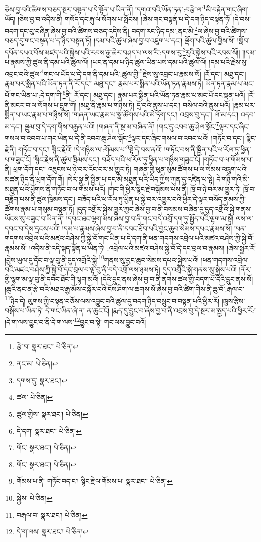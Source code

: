 ཅེས་བྱ་བའི་ཚིགས་བཅད་སྔར་བསྟན་པ་དེ་སྟོན་པ་ཡིན་ནོ། །དགའ་བའི་ཡོན་ཏན་:བརྩེ་ལ་\footnote{རྩེ་བ་  སྣར་ཐང་།  པེ་ཅིན། }མི་བརྟེན་གང་ཞིག་ཡོད། །ཅེས་བྱ་བ་འདིས་ནི། གསོད་དང་རྐུ་ལ་སོགས་པ་སྤོངས། །ཞེས་གང་བསྟན་པ་དེ་དག་ཉིད་བསྟན་ཏོ། །དེ་བས་བདག་དང་བུ་བཞིན་ཞེས་བྱ་བའི་ཚིགས་བཅད་འདིས་ནི། བདག་རང་ཉིད་དམ་:ནང་མི་\footnote{ནང་མ་  པེ་ཅིན། }ལ་ཞེས་བྱ་བའི་ཚིགས་བཅད་དུ་གང་བསྟན་པ་ད་ཉིད་བསྟན་ཏོ། །དམ་པའི་ཚུལ་ཞེས་བྱ་བ་འཇུག་པ་དང་། ལྡོག་པའི་ཚུལ་གྱིས་སོ། །སློབ་དཔོན་དཔའ་བོས་མཛད་པའི་སྐྱེས་པའི་རབས་རྒྱ་ཆེར་བཤད་པ་ལས་རི་:དགས་རུ་\footnote{དགས་དུ་  སྣར་ཐང་། }རུའི་སྐྱེས་པའི་རབས་སོ།། །།དམ་པ་རྣམས་ཀྱི་ཚུལ་ནི་དམ་པའི་ཚུལ་ལོ། །ཡང་ན་དམ་པ་ཉིད་ཚུལ་ཡིན་པས་དམ་པའི་ཚུལ་ལོ། །དམ་པའི་རྗེས་སུ་འབྲང་བའི་ཚུལ་\footnote{ཚལ་  པེ་ཅིན། }གང་ལ་ཡོད་པ་དེ་དག་ནི་དམ་པའི་:ཚུལ་གྱི་\footnote{ཚུལ་གྱིས་  སྣར་ཐང་།  པེ་ཅིན། }རྗེས་སུ་འབྲང་པ་རྣམས་སོ། །རོ་དང་། མཐུ་དང་། རྣམ་པར་སྨིན་པའི་ཡོན་ཏན་ནི་རོ་དང་། མཐུ་དང་། རྣམ་པར་སྨིན་པའི་ཡོན་ཏན་རྣམས་ཏེ། ཡོན་ཏན་རྣམ་པ་མང་པོ་གང་ཡིན་པ་:དེ་དག་གི་\footnote{དེ་དག་  སྣར་ཐང་།  པེ་ཅིན། }ནི། རོ་དང་། མཐུ་དང་། རྣམ་པར་སྨིན་པའི་ཡོན་ཏན་རྣམ་པ་མང་པོ་དང་ལྡན་པའོ། །རོ་ནི་མངར་བ་ལ་སོགས་པ་དྲུག་གོ། །མཐུ་ནི་རྣམ་པ་གཉིས་ཏེ། དྲོ་བའི་ནུས་པ་དང་། བསིལ་བའི་ནུས་པའོ། །རྣམ་པར་སྨིན་པ་ཡང་རྣམ་པ་གཉིས་སོ། །གཞན་ཡང་རྣམ་པ་སྣ་ཚོགས་པའི་མེ་ཏོག་དང་། འབྲས་བུ་དང་། ལོ་མ་དང་། འདབ་མ་དང་། ལྡུམ་བུ་དེ་དག་གིས་བརྒྱན་པའོ། །གཞན་ནི་སྔ་མ་བཞིན་ནོ། །གང་དུ་འབབ་ཆུ་ཤེལ་སྒོང་\footnote{གོང་  སྣར་ཐང་།  པེ་ཅིན། }ལྟར་དང་ཞིང་གསལ་བ་འབབ་པ་གང་ཡིན་པ་དེ་ནི་འབབ་ཆུ་ཤེལ་སྒོང་\footnote{གོང་  སྣར་ཐང་།  པེ་ཅིན། }ལྟར་དང་ཞིང་གསལ་བ་འབབ་པའོ། །གཏོང་བ་དང་། སྙིང་རྗེ་ནི། གཏོང་བ་དང་། སྙིང་རྗེའོ། །དེ་གཉིས་ལ་:གོམས་པ་\footnote{གོམས་པ་ནི། གཏོང་བད་ང་། སྙིང་རྗེ་ལ་གོམས་པ་  སྣར་ཐང་།  པེ་ཅིན། }སྟེ་དེ་བས་ནའོ། །གཏོང་བས་ནི་སྦྱིན་པའི་ཕ་རོལ་ཏུ་ཕྱིན་པ་གཟུང་ངོ། །སྙིང་རྗེས་ནི་ཚུལ་ཁྲིམས་དང་། བཟོད་པའི་ཕ་རོལ་ཏུ་ཕྱིན་པ་གཉིས་གཟུང་ངོ། །གཏོང་བ་ལ་གོམས་པ་ནི། ཕྲག་དོག་དང་། འཇུངས་པ་ཉེ་བར་འོང་བར་མ་གྱུར་ཏེ། གཞན་གྱི་ཕུན་སུམ་ཚོགས་པ་ལ་སེམས་འཁྲུག་པའི་མཚན་ཉིད་ནི་ཕྲག་དོག་གོ། །སེར་སྣ་ནི་སྦྱིན་པ་དང་མི་མཐུན་པའི་ཡིད་ཀྱིས་ཀུན་དུ་འཛིན་པ་སྟེ། དེ་གཉི་གའི་མི་མཐུན་པའི་ཕྱོགས་ནི་གཏོང་བ་ལ་གོམས་པའོ། །གང་གི་ཕྱིར་སྙིང་རྗེ་བསྒོམས་པས་ནི། ཁྲོ་བ་ཉེ་བར་མ་གྱུར་ཏེ། ཁྲོ་བ་བཟློག་པས་ནི་ཚུལ་ཁྲིམས་དང་། བཟོད་པའི་ཕ་རོལ་ཏུ་ཕྱིན་པ་སྐྱེ་བར་འགྱུར་བའི་ཕྱིར་དེ་ལྟར་བསོད་ནམས་ཀྱི་ཚོགས་རྣམ་པ་གསུམ་བསྟན་ཏོ། །དུད་འགྲོར་སྐྱེས་གྱུར་ཀྱང་ཞེས་བྱ་བ་ནི་བསམས་བཞིན་དུ་དུད་འགྲོའི་སྐྱེ་གནས་ཡོངས་སུ་བཟུང་བ་ཡིན་ནོ། །དབང་ཐང་ལྷག་མས་ཞེས་བྱ་བ་ནི་གང་བདེ་འགྲོ་དག་ཏུ་སྤྱོད་པའི་ལྷག་མ་སྟེ། ལས་ལ་དབང་བ་དེས་དྲངས་པའོ། །དམ་པ་རྣམས་ཞེས་བྱ་བ་ནི་དབང་ཐོབ་པའི་བྱང་ཆུབ་སེམས་དཔའ་རྣམས་སོ། །ཕན་གདགས་འབྲེལ་པའི་མཛའ་བཤེས་ཀྱི་སྐྱེ་བོ་གང་ཡིན་པ་དེ་དག་ནི་ཕན་གདགས་འབྲེལ་པའི་མཛའ་བཤེས་ཀྱི་སྐྱེ་བོ་རྣམས་སོ། །འདིས་ནི་འདི་སྐད་སྟོན་པ་ཡིན་ཏེ། :འབྲེལ་པའི་མཛའ་བཤེས་སྐྱེ་བོ་དེ་དང་བྲལ་བ་རྣམས། །ཞེས་སྦྱར་རོ། །བྱེས་ཡུལ་དུ་དོང་བ་ལྟ་བུ་ནི་དུད་འགྲོའི་སྐྱེ་\footnote{སྐྱེས་  པེ་ཅིན། }གནས་སུ་བྱང་ཆུབ་སེམས་དཔའ་སྐྱེས་པའོ། །ཕན་གདགས་འབྲེལ་བའི་མཛའ་བཤེས་ཀྱི་སྐྱེ་བོ་དང་བྲལ་བ་ལྟ་བུ་ནི་བདེ་འགྲོ་ལས་ཉམས་ཏེ། དུད་འགྲོའི་སྐྱེ་གནས་སུ་སྐྱེས་པའོ། །ནོར་གྱི་ལྷག་མ་ལྟ་བུ་ནི་དབང་ཐོང་གི་ལྷག་མའོ། །དེའི་དྲུང་ནས་ཞེས་བྱ་བ་ནི་ནགས་ཚལ་གྱི་བདག་པོ་དེའི་དྲུང་ནས་སོ། །ཆུའི་ནང་ན་རྩེ་བའི་མཐའ་རྒྱ་མོས་བསྐོར་བའི་ངོས་ཤིག་ལ་ཆགས་སོ་ཞེས་བྱ་བའི་ཚིག་གིས་ནི་ཆུ་བོ་:རྒལ་བ་\footnote{བརྒལ་བ་  སྣར་ཐང་།  པེ་ཅིན། }ཉིད་དེ། ལུགས་ཀྱི་བསྟན་བཅོས་ལས་འབྱུང་བའི་ཚུལ་དུ་བདག་ཉིད་བསྲུང་བ་བསྟན་པའི་ཕྱིར་རོ། །ཁྲུས་རྩིས་བསྒོས་པ་ཡིན་ཏེ། དེ་གང་ཡིན་ཞེ་ན། ན་ཆུང་ངོ། །རྨད་དུ་བྱུང་བ་ཞེས་བྱ་བ་ནི་འབྲས་བུ་དེ་སྔར་མ་སྤྱད་པའི་ཕྱིར་རོ:། །དེ་ག་ལས་བྱུང་བ་ནི་དེ་ག་ལས་\footnote{དེ་ག་ལས་  སྣར་ཐང་།  པེ་ཅིན། }བྱུང་བ་སྟེ། གང་ལས་བྱུང་བའོ། 